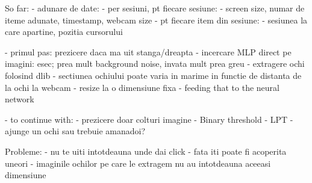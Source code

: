 So far:
    - adunare de date:
        - per sesiuni, pt fiecare sesiune:
            - screen size, numar de iteme adunate, timestamp, webcam size
        - pt fiecare item din sesiune:
            - sesiunea la care apartine, pozitia cursorului
    
    - primul pas: prezicere daca ma uit stanga/dreapta
    - incercare MLP direct pe imagini: esec; prea mult background noise, invata mult prea greu
    - extragere ochi folosind dlib
        - sectiunea ochiului poate varia in marime in functie de distanta de la ochi la webcam
        - resize la o dimensiune fixa
        - feeding that to the neural network
    
    - to continue with:
    - prezicere doar colturi imagine
    - Binary threshold
    - LPT
    - ajunge un ochi sau trebuie amanadoi?


Probleme:
    - nu te uiti intotdeauna unde dai click
    - fata iti poate fi acoperita uneori
    - imaginile ochilor pe care le extragem nu au intotdeauna aceeasi dimensiune